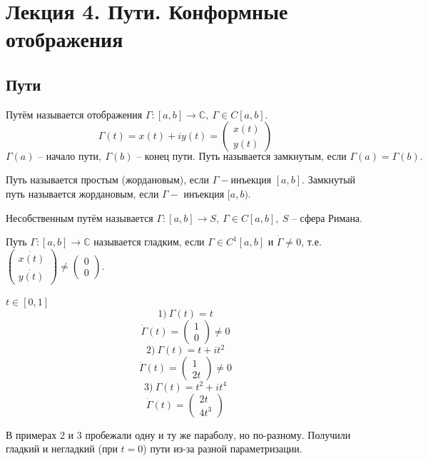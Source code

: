 
\section{Лекция 4. Пути. Конформные отображения}
\subsection{Пути}
 Путём называется отображения $\Gamma : [a, b] \to \mathbb{C}, \ \Gamma \in C[a, b]$.
\[\Gamma(t) = x(t) +iy(t) = \left(\begin{array}{ll}
    x(t) \\
    y(t)    
\end{array}\right)\]
\[\Gamma(a) \text{ -- начало пути}, \ \Gamma(b) \text{ -- конец пути. Путь называется замкнутым, если } \Gamma(a) = \Gamma(b).\]

 Путь называется простым (жордановым), если $\Gamma-$инъекция $[a, b]$. Замкнутый путь называется жордановым, если $\Gamma-$ инъекция $[a, b).$ 

 Несобственным путём называется $\Gamma : [a, b] \to S, \ \Gamma \in C[a,b], \ S$ -- сфера Римана.

 Путь $\Gamma:[a, b]\to \mathbb{C}$ называется гладким, если $\Gamma \in C^1[a,b]$ и $\dot{\Gamma} \neq 0$, т.е. $\left(\begin{array}{ll}
    \dot{x(t)} \\
    \dot{y(t)}    
\end{array}\right) \neq \left(\begin{array}{ll}
 0 \\
 0    
\end{array}\right).$

 $t \in [0, 1]$
\[1) \ \Gamma(t) = t\]
\[\dot{\Gamma}(t) = \left(\begin{array}{ll}
1 \\
0    
\end{array}\right) \neq 0\]
\[2) \ \Gamma(t) = t + it^2\]
\[\dot{\Gamma}(t) = \left(\begin{array}{ll}
1 \\
2t   
\end{array}\right) \neq 0\]
\[3) \ \Gamma(t) = t^2+it^4\]
\[\dot{\Gamma}(t) = \left(\begin{array}{ll}
2t \\
4t^3   
\end{array}\right)\]

В примерах 2 и 3 пробежали одну и ту же параболу, но по-разному. Получили гладкий и негладкий (при $t=0$) пути из-за разной параметризации.

